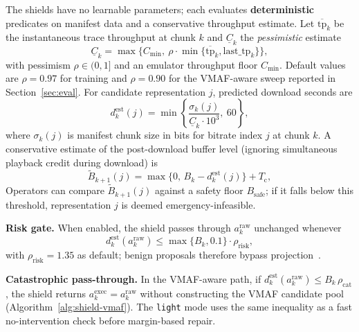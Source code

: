 \documentclass[preprint,12pt,times]{elsarticle}
\begin{document}
The shields have no learnable parameters; each evaluates \textbf{deterministic} predicates on manifest data and a conservative throughput estimate.
Let \(\overline{\mathrm{tp}}_k\) be the instantaneous trace throughput at chunk \(k\) and \(\underline{C}_k\) the \emph{pessimistic} estimate
\begin{equation}
\label{eq:tp-pessimistic}
    \underline{C}_k
    = \max\!\Big\{C_{\min},\ \rho \cdot \min\{\overline{\mathrm{tp}}_k,\mathrm{last\_tp}_k\}\Big\},
\end{equation}
with pessimism \(\rho\in(0,1]\) and an emulator throughput floor \(C_{\min}\).
Default values are \(\rho{=}0.97\) for training and \(\rho{=}0.90\) for the VMAF-aware sweep reported in Section~\ref{sec:eval}.
For candidate representation \(j\), predicted download seconds are
\begin{equation}
\label{eq:dest}
    d^{\mathrm{est}}_k(j)
    = \min\!\left\{\frac{\sigma_k(j)}{\underline{C}_k\cdot 10^{3}},\ 60\right\},
\end{equation}
where \(\sigma_k(j)\) is manifest chunk size in bits for bitrate index \(j\) at chunk \(k\).
A conservative estimate of the post-download buffer level (ignoring simultaneous playback credit during download) is
\begin{equation}
\label{eq:btilde}
    \widetilde{B}_{k+1}(j)=\max\{0,\,B_k-d^{\mathrm{est}}_k(j)\}+T_{\mathrm{c}},
\end{equation}
Operators can compare \(\widetilde{B}_{k+1}(j)\) against a safety floor \(B_{\mathrm{safe}}\); if it falls below this threshold, representation \(j\) is deemed emergency-infeasible.

\textbf{Risk gate.} When enabled, the shield passes through \(a^{\mathrm{raw}}_k\) unchanged whenever
\begin{equation}
\label{eq:risk-gate}
    d^{\mathrm{est}}_k(a^{\mathrm{raw}}_k)\le \max\{B_k,0.1\}\cdot\rho_{\mathrm{risk}},
\end{equation}
with \(\rho_{\mathrm{risk}}{=}1.35\) as default; benign proposals therefore bypass projection~\cite{alshiekh2018shielding}.

\textbf{Catastrophic pass-through.} In the VMAF-aware path, if \(d^{\mathrm{est}}_k(a^{\mathrm{raw}}_k)\le B_k\,\rho_{\mathrm{cat}}\), the shield returns \(a^{\mathrm{exec}}_k=a^{\mathrm{raw}}_k\) without constructing the VMAF candidate pool (Algorithm~\ref{alg:shield-vmaf}).
The \texttt{light} mode uses the same inequality as a fast no-intervention check before margin-based repair.
\end{document}
